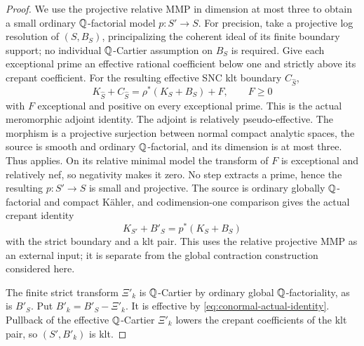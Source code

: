 \begin{proof}
We use the projective relative MMP in dimension at most three to obtain
a small ordinary \(\mathbb Q\)-factorial model \(p:S'\to S\).  For precision,
take a projective log resolution of \((S,B_S)\), principalizing the
coherent ideal of its finite boundary support; no individual
\(\mathbb Q\)-Cartier assumption on \(B_S\) is required.  Give each exceptional
prime an effective rational coefficient below one and strictly above
its crepant coefficient.  For the resulting effective SNC klt boundary
\(C_{\widehat S}\),
\[
 K_{\widehat S}+C_{\widehat S}
   =\rho^*(K_S+B_S)+F,\qquad F\geq0
\]
with \(F\) exceptional and positive on every exceptional prime.  This
is the actual meromorphic adjoint identity.  The adjoint is relatively
pseudo-effective.  The morphism is a projective surjection between normal
compact analytic spaces, the source is smooth and ordinary
\(\mathbb Q\)-factorial, and its dimension is at most three.  Thus
\cite[Proposition~2.26]{DasHacon2024} applies.  On its relative minimal
model the transform of \(F\) is exceptional and relatively nef, so
negativity \cite[Lemma~1.3]{Wang2021} makes it zero.  No step extracts
a prime, hence the resulting \(p:S'\to S\) is small and projective.
The source is ordinary globally \(\mathbb Q\)-factorial and compact K\"ahler,
and codimension-one comparison gives the actual crepant identity
\begin{equation}\label{eq:conormal-small-crepant}
 K_{S'}+B'_S=p^*(K_S+B_S)
\end{equation}
with the strict boundary and a klt pair.  This uses the relative
projective MMP as an external input; it is separate from the global
contraction construction considered here.

The finite strict transform \(\Xi'_k\) is \(\mathbb Q\)-Cartier by ordinary
global \(\mathbb Q\)-factoriality, as is \(B'_S\).  Put
\(B'_k=B'_S-\Xi'_k\).  It is effective by
\eqref{eq:conormal-actual-identity}.  Pullback of the effective
\(\mathbb Q\)-Cartier \(\Xi'_k\) lowers the crepant coefficients of the klt
pair, so \((S',B'_k)\) is klt.


\end{proof}
